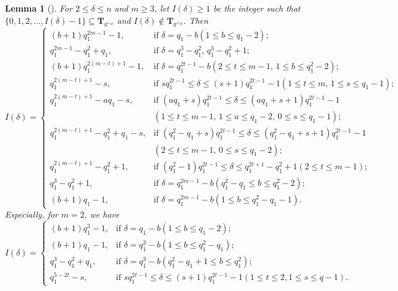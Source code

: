 \documentclass[10pt,a4paper]{amsart}
\newtheorem{lemma}{Lemma}
\begin{document}
\begin{lemma}[\cite{10068556}]
    \label{Hermitian dual BCH}
    For $2 \leq \delta \leq n$ and $m \geq 3$, let $I(\delta) \geq 1$ be the integer such that $\{0,1,2,\dots,I(\delta)-1\} \subseteq \textbf{T}_{g^{\perp_H}}$ and $I(\delta) \notin \textbf{T}_{g^{\perp_H}}$. Then
    \[
    I(\delta)=
    \begin{cases}
        (b+1)q_1^{2m-1}-1, & \text{if } \delta=q_1-b(1 \leq b \leq q_1-2);\\
        q_1^{2m-1}-q_1^2+q_1, & \text{if } \delta=q_1^3-q_1^2,\, q_1^3-q_1^2+1;\\
        (b+1)q_1^{2(m-t)+1}-1, & \text{if } \delta=q_1^{2t-1}-b(2 \leq t \leq m-1,\, 1 \leq b \leq q_1^2-2);\\
        q_1^{2(m-t)+1}-s, & \text{if } sq_1^{2t-1} \leq \delta \leq (s+1)q_1^{2t-1}-1(1 \leq t \leq m,\, 1 \leq s \leq q_1-1);\\
        q_1^{2(m-t)+1}-aq_1-s, & \text{if } (aq_1+s)q_1^{2t-1} \leq \delta \leq (aq_1+s+1)q_1^{2t-1}-1\\
        &(1 \leq t \leq m-1,\, 1 \leq a \leq q_1-2,\, 0 \leq s \leq q_1-1);\\
        q_1^{2(m-t)+1}-q_1^2+q_1-s, & \text{if } (q_1^2-q_1+s)q_1^{2t-1} \leq \delta \leq (q_1^2-q_1+s+1)q_1^{2t-1}-1\\
        &(2 \leq t \leq m-1,\, 0 \leq s \leq q_1-2);\\
        q_1^{2(m-t)+1}-q_1^2+1, & \text{if } (q_1^2-1)q_1^{2t-1} \leq \delta \leq q_1^{2t+1}-q_1^2+1(2 \leq t \leq m-1);\\
        q_1^3-q_1^2+1, & \text{if } \delta=q_1^{2m-1}-b(q_1^2-q_1 \leq b \leq q_1^2-2);\\
        (b+1)q_1-1, & \text{if } \delta=q_1^{2m-1}-b(1 \leq b \leq q_1^2-q_1-1).
    \end{cases}
    \]
    Especially, for $m=2$, we have
    \[
    I(\delta)=
    \begin{cases}
        (b+1)q_1^3-1, & \text{if } \delta=q_1-b(1 \le b\le q_1-2);\\
        (b+1)q_1-1, & \text{if } \delta=q_1^3-b(1\le b\le q_1^2-q_1);\\
        q_1^3-q_1^2+q_1, & \text{if } \delta=q_1^3-b(q_1^2-q_1+1\le b\le q_1^2);\\
        q_1^{5-2t}-s, & \text{if } sq_1^{2t-1}\le \delta\le (s+1)q_1^{2t-1}-1(1\le t\le 2,1\le s\le q-1).
    \end{cases}
    \]
\end{lemma}
    
\end{document}
